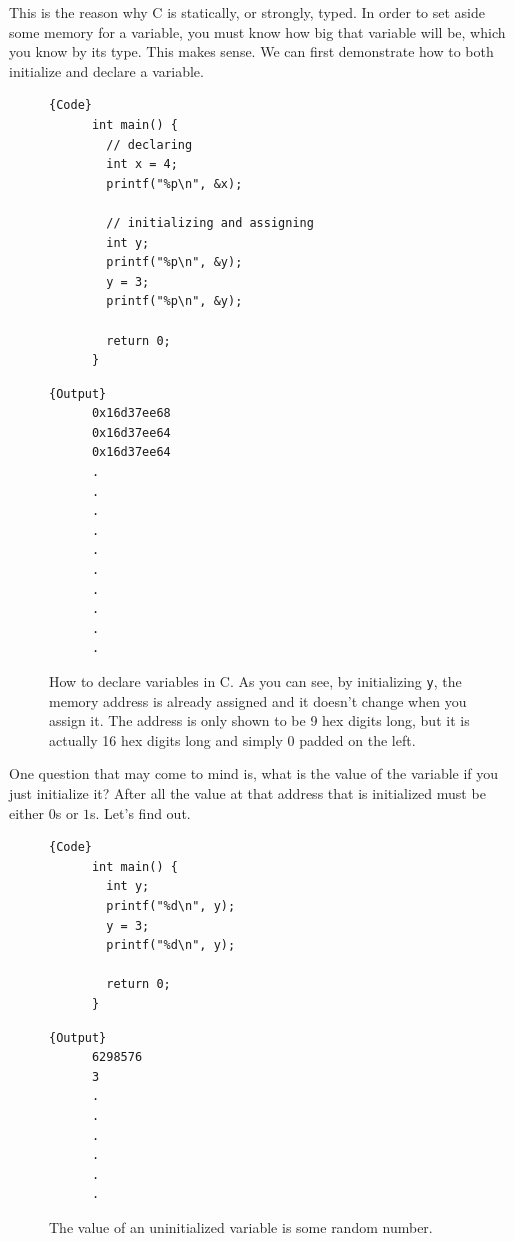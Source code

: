 \documentclass{article}
\newcounter{question}[section]
\begin{document}
  This is the reason why C is statically, or strongly, typed. In order to set aside some memory for a variable, you must know how big that variable will be, which you know by its type. This makes sense. We can first demonstrate how to both initialize and declare a variable. 

  \begin{figure}[H]
    \centering 
    \noindent\begin{minipage}{.5\textwidth}
    \begin{lstlisting}[]{Code}
      int main() {
        // declaring 
        int x = 4;   
        printf("%p\n", &x); 
        
        // initializing and assigning
        int y; 
        printf("%p\n", &y); 
        y = 3; 
        printf("%p\n", &y); 

        return 0; 
      }
    \end{lstlisting}
    \end{minipage}
    \hfill
    \begin{minipage}{.49\textwidth}
    \begin{lstlisting}[]{Output}
      0x16d37ee68
      0x16d37ee64
      0x16d37ee64 
      .
      .
      .
      .
      .
      .
      .
      .
      .
      .
    \end{lstlisting}
    \end{minipage}
    \caption{How to declare variables in C. As you can see, by initializing \texttt{y}, the memory address is already assigned and it doesn't change when you assign it. The address is only shown to be 9 hex digits long, but it is actually 16 hex digits long and simply 0 padded on the left. } 
    \label{fig:declaring_initializing_variables}
  \end{figure}

  One question that may come to mind is, what is the value of the variable if you just initialize it? After all the value at that address that is initialized must be either $0$s or $1$s. Let's find out. 

  \begin{figure}[H]
    \centering 
    \noindent\begin{minipage}{.5\textwidth}
    \begin{lstlisting}[]{Code}
      int main() { 
        int y; 
        printf("%d\n", y); 
        y = 3; 
        printf("%d\n", y); 

        return 0; 
      }
    \end{lstlisting}
    \end{minipage}
    \hfill
    \begin{minipage}{.49\textwidth}
    \begin{lstlisting}[]{Output}
      6298576 
      3
      .
      .
      .
      .
      .
      .
    \end{lstlisting}
    \end{minipage}
    \caption{The value of an uninitialized variable is some random number. } 
    \label{fig:uninitialized_variable}
  \end{figure}
\end{document}
